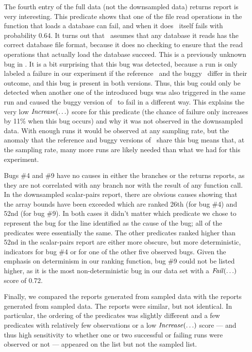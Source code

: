 The fourth entry of the full data (not the  downsampled data)
returns report is very interesting.  This predicate shows that one of
the file read operations in the function that loads a database can
fail, and when it does \moss\ itself fails with probability 0.64.
It turns out that \moss\ assumes that any database it reads has the
correct database file format, because it does no checking to ensure
that the read operations that actually load the database succeed.  This is a previously
unknown bug in \moss.  It is a bit surprising that this bug was detected,
because a run is only labeled a failure in our experiment if the
reference \moss\ and the buggy \moss\ differ in their outcome, and
this bug is present in both versions.  Thus, this bug could only be detected
when another one of the introduced bugs was also triggered in the same
run and caused the buggy version of \moss\ to fail in a different way.
This explains the very low $\mbox{\textit{Increase}}(\ldots)$ score for this
predicate (the chance of failure only increases by 11\% when this bug
occurs) and why it was not observed in the 
downsampled data.  With enough runs it would be observed at
any sampling rate, but the anomaly that the reference and buggy
versions of \moss\ share this bug means that, at the
 sampling rate, many more runs are likely needed
than what we had for this experiment.

Bugs \#4 and \#9 have no causes in either the branches or the returns
reports, as they are not correlated with any branch nor with the
result of any function call.  In the  downsampled
scalar-pairs report, there are obvious causes showing that the array
bounds have been exceeded which are ranked 26th (for bug \#4) and 52nd (for bug
\#9).  In both cases it didn't matter which predicate we chose to
represent the bug for the line identified as the cause of the bug; all
of the predicates were essentially the same.  The other
predicates ranked higher than 52nd in the scalar-pairs report are
either more obscure, but more deterministic, indicators for bug \#4 or
for one of the other five observed bugs.  Given the emphasis on
determinism in our ranking function, bug \#9 could not be listed
higher, as it is the most non-deterministic bug in our data set with a
$\mbox{\textit{Fail}}(\ldots)$ score of 0.72.

Finally, we compared the reports generated from  sampled data
with the reports generated from  sampled data.  The reports were
similar, but not identical.  In particular, the ordering of the
predicates was slightly different and a few predicates with relatively
few observations or a low $\mbox{\textit{Increase}}(\ldots)$ score --- and thus high
sensitivity to whether one or two successful or failing runs were
observed or not --- appeared on
the  list but not the  sampled list.

